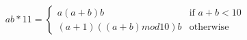 \documentclass[preview]{standalone}
\begin{document}
\begin{align*}
ab * 11 =\begin{cases}a(a+b)b & \text{if } a + b < 10 \\(a + 1)((a + b) mod 10)b & \text{otherwise}\end{cases}
\end{align*}
\end{document}
